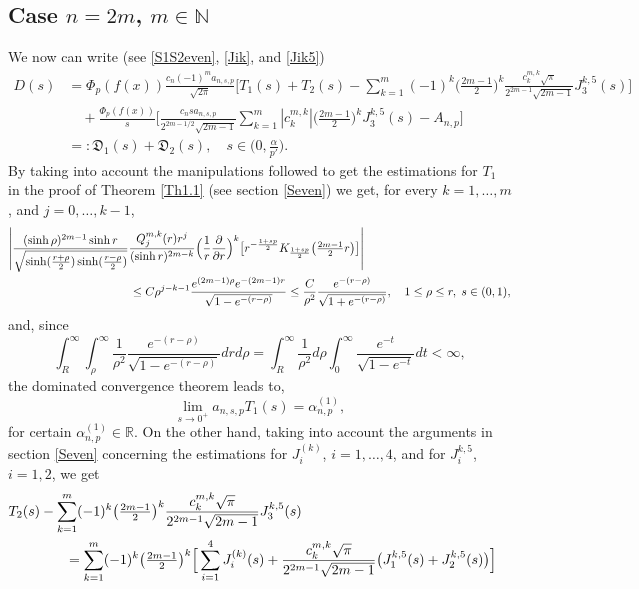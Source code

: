 \documentclass[a4paper,10pt, reqno]{amsart}
\theoremstyle{definition}
\theoremstyle{remark}
\numberwithin{equation}{section}
\begin{document}
{\subsection{Case $n=2m$, $m\in \mathbb N$}\label{Deven} We now can write (see \eqref{S1S2even}, \eqref{Jik}, and \eqref{Jik5})
\begin{align*}
    D(s)&=\Phi _p(f(x))\frac{c_n(-1)^ma_{n,s,p}}{\sqrt{2\pi}}\Big[T_1(s)+T_2(s)-\sum_{k=1}^m(-1)^k\big(\tfrac{2m-1}{2}\big)^k\frac{c_k^{m,k}\sqrt{\pi }}{2^{2m-1}\sqrt{2m-1}}J_3^{k,5}(s)\Big]\\
    &\quad +\frac{\Phi_p(f(x))}{s}\Big[\frac{c_nsa_{n,s,p}}{2^{2m-1/2}\sqrt{2m-1}}\sum_{k=1}^m|c_k^{m,k}|\big(\tfrac{2m-1}{2}\big)^kJ_3^{k,5}(s)-A_{n,p}\Big]\\
    &=:\mathfrak D_1(s)+\mathfrak D_2(s),\quad s\in \big(0,\tfrac{\alpha}{p'}\big).
\end{align*}
By taking into account the manipulations followed to get the estimations for $T_1$ in the proof of Theorem \ref{Th1.1} (see section \ref{Seven}) we get, for every $k=1,\ldots, m$, and $j=0,\ldots, k-1$, 
\begin{align*}
\left|\frac{(\sinh \rho )^{2m-1}\sinh r}{\sqrt{\sinh (\frac{r+\rho}{2})\sinh (\frac{r-\rho }{2})}}\frac{Q_j^{m,k}(r)r^j}{(\sinh r)^{2m-k}}\Big(\frac{1}{r}\frac{\partial }{\partial r}\Big)^k\big[r ^{-\frac{1+sp}{2}}K_{\frac{1+sp}{2}}\big(\tfrac{2m-1}{2}r\big)\big]\right|&\\
&\hspace{-7cm}\leq C \rho^{j-k-1}\frac{e^{(2m-1)\rho }e^{-(2m-1)r}}{\sqrt{1-e^{-(r-\rho )}}}\leq \frac{C}{\rho ^2}\frac{e^{-(r-\rho )}}{\sqrt{1+e^{-(r-\rho )}}},\quad 1\leq \rho \leq r,\;s\in (0,1),
\end{align*}
and, since 
$$
\int_R^\infty\int_\rho^\infty \frac{1}{\rho ^2}\frac{e^{-(r-\rho)}}{\sqrt{1-e^{-(r-\rho )}}}drd\rho=\int_R^\infty \frac{1}{\rho ^2}d\rho\int_0^\infty \frac{e^{-t}}{\sqrt{1-e^{-t}}}dt<\infty,
$$
the dominated convergence theorem leads to, 
$$
\lim_{s\rightarrow 0^+}a_{n,s,p}T_1(s)=\alpha_{n,p}^{(1)},
$$
for certain $\alpha_{n,p}^{(1)}\in \mathbb R$. On the other hand, taking into account the arguments in section \ref{Seven} concerning the estimations for $J_i^{(k)}$, $i=1,\ldots, 4$, and for $J_i^{k,5}$, $i=1,2$, we get
\begin{align*}
T_2(s)-\sum_{k=1}^m (-1)^k\big(\tfrac{2m-1}{2}\big)^k\frac{c_k^{m,k}\sqrt{\pi }}{2^{2m-1}\sqrt{2m-1}}J_3^{k,5}(s)\\
&\hspace{-6cm}=\sum_{k=1}^m (-1)^k\big(\tfrac{2m-1}{2}\big)^k\Big[\sum_{i=1}^4 J_i^{(k)}(s)+\frac{c_k^{m,k}\sqrt{\pi }}{2^{2m-1}\sqrt{2m-1}}\big(J_1^{k,5}(s)+J_2^{k,5}(s)\big)\Big]\\

\end{align*}}
\end{document}

